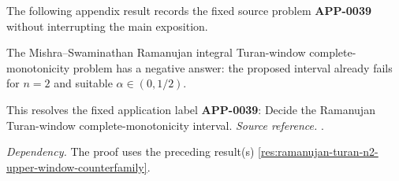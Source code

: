 The following appendix result records the fixed source problem \textbf{APP-0039} \cite{mishra-swaminathan-ramanujan} without interrupting the main exposition.
\begin{counterexample}
\label{res:ramanujan-turan-window-negative-answer}
The Mishra--Swaminathan Ramanujan integral Turan-window complete-monotonicity problem has a negative answer: the proposed interval already fails for \(n=2\) and suitable \(\alpha\in(0,1/2)\).

This resolves the fixed application label \textbf{APP-0039}: Decide the Ramanujan Turan-window complete-monotonicity interval.
\emph{Source reference.} \cite{mishra-swaminathan-ramanujan}.

\emph{Dependency.} The proof uses the preceding result(s) \ref{res:ramanujan-turan-n2-upper-window-counterfamily}.
\end{counterexample}

